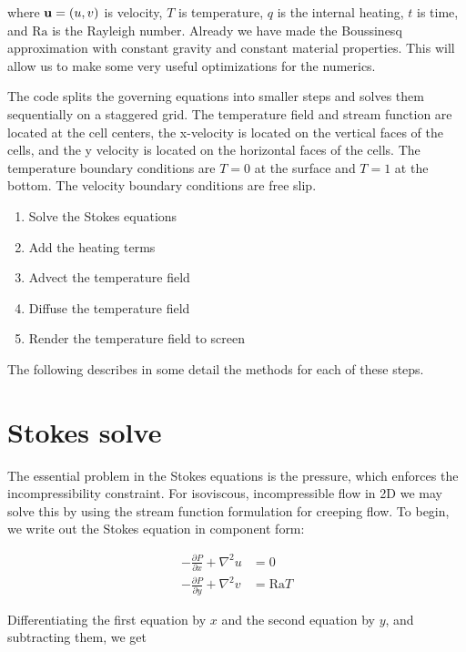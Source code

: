 \documentclass[a4paper,10pt]{article}
\begin{document}
where ${\bf u} = (u,v)$ is velocity, $T$ is temperature, $q$ is the internal heating, $t$ is time, and $\mathrm{Ra}$ is the Rayleigh number.
Already we have made the Boussinesq approximation with constant gravity and constant material properties.
This will allow us to make some very useful optimizations for the numerics.

The code splits the governing equations into smaller steps and solves them sequentially on a staggered grid.
The temperature field and stream function are located at the cell centers, the x-velocity is located on the vertical faces of the cells, and the y velocity is located on the horizontal faces of the cells.
The temperature boundary conditions are $T=0$ at the surface and $T=1$ at the bottom.
The velocity boundary conditions are free slip.

\begin{enumerate}
\item{Solve the Stokes equations}
\item{Add the heating terms}
\item{Advect the temperature field}
\item{Diffuse the temperature field}
\item{Render the temperature field to screen}
\end{enumerate}

The following describes in some detail the methods for each of these steps.

\section{Stokes solve}

The essential problem in the Stokes equations is the pressure, which enforces the incompressibility constraint.
For isoviscous, incompressible flow in 2D we may solve this by using the stream function formulation for creeping flow.
To begin, we write out the Stokes equation in component form:

\begin{equation}
\begin{aligned}
-\frac{\partial P}{\partial x} + \nabla^2 u &= 0 \\
-\frac{\partial P}{\partial y} + \nabla^2 v &= \mathrm{Ra} T
\end{aligned}
\end{equation} 

Differentiating the first equation by $x$ and the second equation by $y$, and subtracting them, we get
\end{document}

